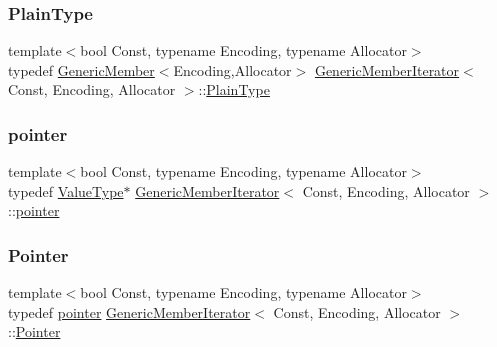 \subsubsection{\texorpdfstring{Plain\+Type}{PlainType}}
{\footnotesize\ttfamily template$<$bool Const, typename Encoding, typename Allocator$>$ \\
typedef \hyperlink{classGenericMember}{Generic\+Member}$<$Encoding,Allocator$>$ \hyperlink{classGenericMemberIterator}{Generic\+Member\+Iterator}$<$ Const, Encoding, Allocator $>$\+::\hyperlink{classGenericMemberIterator_ac0d50d12ba074e68837964244668c66b}{Plain\+Type}\hspace{0.3cm}{\ttfamily [private]}}

\mbox{\label{classGenericMemberIterator_a7c3623bc81b06495fd3128398487e99e}} 
\subsubsection{\texorpdfstring{pointer}{pointer}}
{\footnotesize\ttfamily template$<$bool Const, typename Encoding, typename Allocator$>$ \\
typedef \hyperlink{classGenericMemberIterator_a1323c9d064a9c388a1eb62a6e2c17584}{Value\+Type}$\ast$ \hyperlink{classGenericMemberIterator}{Generic\+Member\+Iterator}$<$ Const, Encoding, Allocator $>$\+::\hyperlink{classGenericMemberIterator_a7c3623bc81b06495fd3128398487e99e}{pointer}}

\mbox{\label{classGenericMemberIterator_ac0bd6e77617593892fc13afb00e62f29}} 
\subsubsection{\texorpdfstring{Pointer}{Pointer}}
{\footnotesize\ttfamily template$<$bool Const, typename Encoding, typename Allocator$>$ \\
typedef \hyperlink{classGenericMemberIterator_a7c3623bc81b06495fd3128398487e99e}{pointer} \hyperlink{classGenericMemberIterator}{Generic\+Member\+Iterator}$<$ Const, Encoding, Allocator $>$\+::\hyperlink{classGenericMemberIterator_ac0bd6e77617593892fc13afb00e62f29}{Pointer}}



